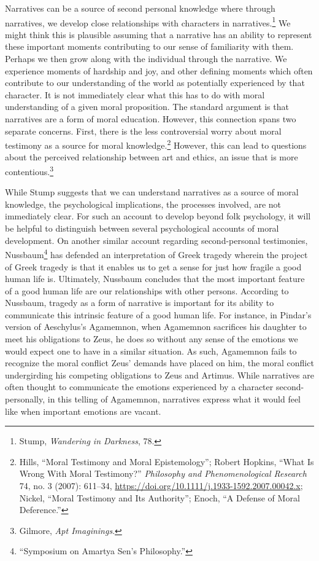 \documentclass[
  12pt,
]{book}
\theoremstyle{definition}
\theoremstyle{definition}
\theoremstyle{definition}
\theoremstyle{definition}
\theoremstyle{remark}
\begin{document}
Narratives can be a source of second personal knowledge where through narratives, we develop close relationships with characters in narratives.\footnote{Stump, \emph{Wandering in {Darkness}}, 78.} We might think this is plausible assuming that a narrative has an ability to represent these important moments contributing to our sense of familiarity with them. Perhaps we then grow along with the individual through the narrative. We experience moments of hardship and joy, and other defining moments which often contribute to our understanding of the world as potentially experienced by that character. It is not immediately clear what this has to do with moral understanding of a given moral proposition. The standard argument is that narratives are a form of moral education. However, this connection spans two separate concerns. First, there is the less controversial worry about moral testimony as a source for moral knowledge.\footnote{Hills, {``Moral Testimony and Moral Epistemology''}; Robert Hopkins, {``What {Is Wrong With Moral Testimony}?''} \emph{Philosophy and Phenomenological Research} 74, no. 3 (2007): 611--34, \url{https://doi.org/10.1111/j.1933-1592.2007.00042.x}; Nickel, {``Moral {Testimony} and Its {Authority}''}; Enoch, {``A {Defense} of {Moral Deference}.''}} However, this can lead to questions about the perceived relationship between art and ethics, an issue that is more contentious.\footnote{Gilmore, \emph{Apt {Imaginings}}.}

While Stump suggests that we can understand narratives as a source of moral knowledge, the psychological implications, the processes involved, are not immediately clear. For such an account to develop beyond folk psychology, it will be helpful to distinguish between several psychological accounts of moral development. On another similar account regarding second-personal testimonies, Nussbaum\footnote{{``Symposium on {Amartya Sen}'s Philosophy.''}} has defended an interpretation of Greek tragedy wherein the project of Greek tragedy is that it enables us to get a sense for just how fragile a good human life is. Ultimately, Nussbaum concludes that the most important feature of a good human life are our relationships with other persons. According to Nussbaum, tragedy as a form of narrative is important for its ability to communicate this intrinsic feature of a good human life. For instance, in Pindar's version of Aeschylus's Agamemnon, when Agamemnon sacrifices his daughter to meet his obligations to Zeus, he does so without any sense of the emotions we would expect one to have in a similar situation. As such, Agamemnon fails to recognize the moral conflict Zeus' demands have placed on him, the moral conflict undergirding his competing obligations to Zeus and Artimus. While narratives are often thought to communicate the emotions experienced by a character second-personally, in this telling of Agamemnon, narratives express what it would feel like when important emotions are vacant.
\end{document}

